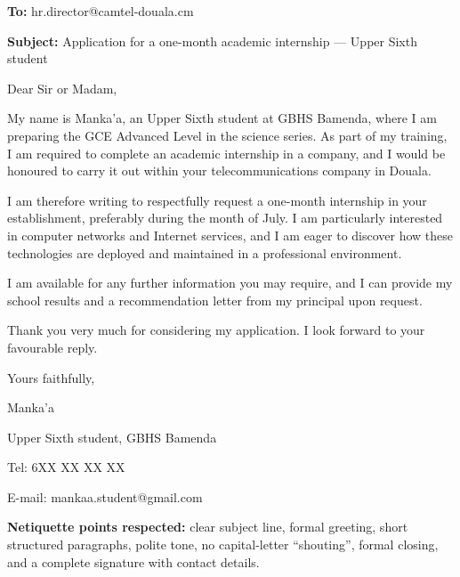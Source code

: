 \documentclass[11pt]{article}
\begin{document}
\begin{corrige}
\textbf{To:} hr.director@camtel-douala.cm\par
\textbf{Subject:} Application for a one-month academic internship — Upper Sixth student\par\medskip
Dear Sir or Madam,\par\medskip
My name is Manka'a, an Upper Sixth student at GBHS Bamenda, where I am preparing the GCE Advanced Level in the science series. As part of my training, I am required to complete an academic internship in a company, and I would be honoured to carry it out within your telecommunications company in Douala.\par\medskip
I am therefore writing to respectfully request a one-month internship in your establishment, preferably during the month of July. I am particularly interested in computer networks and Internet services, and I am eager to discover how these technologies are deployed and maintained in a professional environment.\par\medskip
I am available for any further information you may require, and I can provide my school results and a recommendation letter from my principal upon request.\par\medskip
Thank you very much for considering my application. I look forward to your favourable reply.\par\medskip
Yours faithfully,\par\medskip
Manka'a\par
Upper Sixth student, GBHS Bamenda\par
Tel: 6XX XX XX XX\par
E-mail: mankaa.student@gmail.com\par\medskip
\textbf{Netiquette points respected:} clear subject line, formal greeting, short structured paragraphs, polite tone, no capital-letter ``shouting'', formal closing, and a complete signature with contact details.
\end{corrige}
\end{document}
